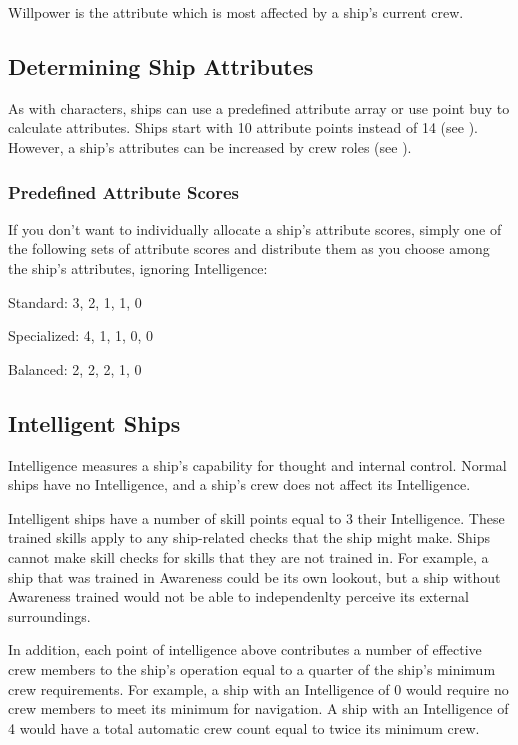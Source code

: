         Willpower is the attribute which is most affected by a ship's current crew.

    \subsection{Determining Ship Attributes}
        As with characters, ships can use a predefined attribute array or use point buy to calculate attributes.
        Ships start with 10 attribute points instead of 14 (see ).
        However, a ship's attributes can be increased by crew roles (see ).

        \subsubsection{Predefined Attribute Scores}
            If you don't want to individually allocate a ship's attribute scores, simply one of the following sets of attribute scores and distribute them as you choose among the ship's attributes, ignoring Intelligence:
            \begin{raggeditemize}
                \item Standard: 3, 2, 1, 1, 0
                \item Specialized: 4, 1, 1, 0, 0
                \item Balanced: 2, 2, 2, 1, 0
            \end{raggeditemize}

    \subsection{Intelligent Ships}
        Intelligence measures a ship's capability for thought and internal control.
        Normal ships have no Intelligence, and a ship's crew does not affect its Intelligence.

        Intelligent ships have a number of skill points equal to 3 \add their Intelligence.
        These trained skills apply to any ship-related checks that the ship might make.
        Ships cannot make skill checks for skills that they are not trained in.
        For example, a ship that was trained in Awareness could be its own lookout, but a ship without Awareness trained would not be able to independenlty perceive its external surroundings.

        In addition, each point of intelligence above  contributes a number of effective crew members to the ship's operation equal to a quarter of the ship's minimum crew requirements.
        For example, a ship with an Intelligence of 0 would require no crew members to meet its minimum for navigation.
        A ship with an Intelligence of 4 would have a total automatic crew count equal to twice its minimum crew.

